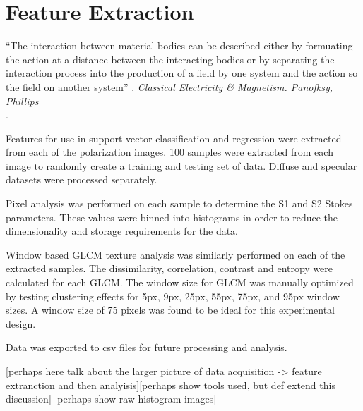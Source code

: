 \chapter{Feature Extraction}
\begin{center}
  \begin{minipage}{0.75\textwidth}
    \begin{small}
      “The interaction between material bodies can be described either by formuating the action at a distance between the interacting bodies or by separating the interaction process into the production of a field by one system and the action so the field on another system” .
      \emph{Classical Electricity \& Magnetism. Panofksy, Phillips}\\.
    \end{small}
  \end{minipage}
  \vspace{0.5cm}
\end{center}

Features for use in support vector classification and regression were extracted from each of the polarization images.  100 samples were extracted from each image to randomly create a training and testing set of data.  Diffuse and specular datasets were processed separately.

Pixel analysis was performed on each sample to determine the S1 and S2 Stokes parameters.  These values were binned into histograms in order to reduce the dimensionality and storage requirements for the data.

Window based GLCM texture analysis was similarly performed on each of the extracted samples.  The dissimilarity, correlation, contrast and entropy were calculated for each GLCM.  The window size for GLCM was manually optimized by testing clustering effects for 5px, 9px, 25px, 55px, 75px, and 95px window sizes.  A window size of 75 pixels was found to be ideal for this experimental design.

Data was exported to csv files for future processing and analysis.

[perhaps here talk about the larger picture of data acquisition -> feature extranction and then analyisis][perhaps show tools used, but def extend this discussion]
[perhaps show raw histogram images]
